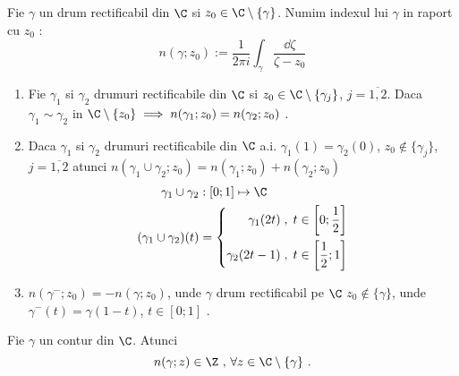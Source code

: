 \begin{definition}
    Fie $\gamma$ un drum rectificabil din $\C$ si $z_0 \in \C \setminus \{ \gamma \}$.
    Numim indexul lui $\gamma$ in raport cu $z_0$ :
    \begin{equation*}
        n(\gamma;z_0) := \frac{1}{2 \pi i} \int_{\gamma} \frac{\dd \zeta}{\zeta - z_0}
    \end{equation*}
\end{definition}

\begin{theorem}
    \begin{enumerate}
        \item Fie $\gamma_1$ si $\gamma_2$ drumuri rectificabile din $\C$
            si $z_0 \in \C \setminus \{\gamma_j\}$, $j=\overline{1,2}$. Daca $\gamma_1 \sim \gamma_2$
            in $\C \setminus\{z_0\} \implies n(\gamma_1;z_0) = n(\gamma_2;z_0)$ .
        \item Daca $\gamma_1$ si $\gamma_2$ drumuri rectificabile din $\C$ a.i.
            $\gamma_1(1) = \gamma_2(0)$, $z_0 \notin \{\gamma_j\}$, $j=\overline{1,2}$ atunci
            $n(\gamma_1 \cup \gamma_2; z_0) = n(\gamma_1; z_0) + n(\gamma_2; z_0)$
            \begin{align*}
                \gamma_1 \cup \gamma_2 &: [0;1] \mapsto \C \\
                (\gamma_1 \cup \gamma_2)(t) &=
                    \left \{
                    \begin{aligned}
                        \gamma_1(2t)\;,\; t \in \left [0; \frac{1}{2} \right] \\
                        \gamma_2(2t - 1)\;,\; t \in \left [\frac{1}{2}; 1 \right]
                    \end{aligned}
                    \right .
            \end{align*}
        \item $n(\gamma^{-}; z_0) = - n(\gamma; z_0)$, unde $\gamma$ drum rectificabil pe $\C$
            $z_0 \notin \{\gamma\}$, unde  $\gamma^{-}(t) = \gamma(1-t) $, $t \in [0;1]$ .
    \end{enumerate}
\end{theorem}

\begin{theorem}
    Fie $\gamma$ un contur din $\C$. Atunci
    \begin{equation*}
        n(\gamma;z)\in\Z \text{ , } \forall z \in \C \setminus \{\gamma\} \text{ .}
    \end{equation*}
    
\end{theorem}

